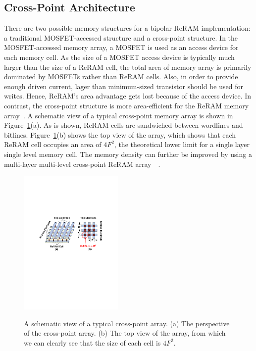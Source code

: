 \subsection{Cross-Point Architecture}
There are two possible memory structures for a bipolar ReRAM
implementation: a traditional MOSFET-accessed structure and a cross-point
structure. In the MOSFET-accessed memory array, a MOSFET is used as an
access device for each memory cell. As the size of a MOSFET access device
is typically much larger than the size of a ReRAM cell, the total area of
memory array is primarily dominated by MOSFETs rather than ReRAM cells.
Also, in order to provide enough driven current, lager than minimum-sized
transistor should be used for writes. Hence, ReRAM's area advantage gets
lost because of the access device.
In contrast, the cross-point structure is more area-efficient for the
ReRAM memory array~\cite{memristor:Cong}. A schematic view of a typical
cross-point memory array is shown in Figure~\ref{fig:array}(a). As is shown, ReRAM cells are sandwiched between wordlines and bitlines.
Figure~\ref{fig:array}(b) shows the top view of the array, which shows that each ReRAM cell occupies an area of $4F^2$, the
theoretical lower limit for a single layer single level memory cell. The
memory density can further be improved by using a multi-layer multi-level
cross-point ReRAM
array~\cite{crossbar_unity}~\cite{memristor:IEDM08_3D}.

\begin{figure}
\centering
  \includegraphics[width=0.45\textwidth]{./figures/crossbar_array2.pdf}\\\vspace{-10pt}
  \caption{A schematic view of a typical cross-point array. (a) The perspective of the cross-point array. 
  (b) The top view of the array, from which we can clearly see that the size of each cell is $4F^2$. }\label{fig:array}
\vspace{-12pt}
\end{figure}


